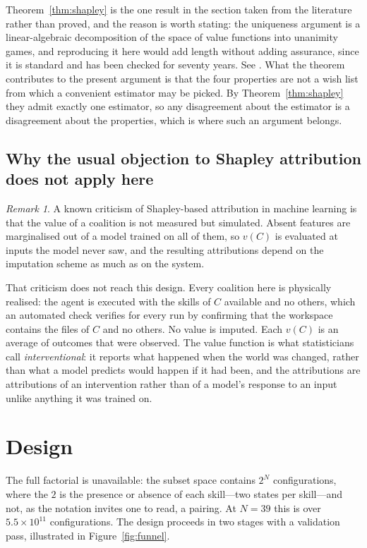 \documentclass[11pt]{article}
\theoremstyle{plain}
\theoremstyle{definition}
\theoremstyle{remark}
\newtheorem{remark}[theorem]{Remark}
\begin{document}
Theorem~\ref{thm:shapley} is the one result in the section taken from the literature rather than proved, and the reason is worth stating: the uniqueness argument is a linear-algebraic decomposition of the space of value functions into unanimity games, and reproducing it here would add length without adding assurance, since it is standard and has been checked for seventy years. See \cite{shapley}. What the theorem contributes to the present argument is that the four properties are not a wish list from which a convenient estimator may be picked. By Theorem~\ref{thm:shapley} they admit exactly one estimator, so any disagreement about the estimator is a disagreement about the properties, which is where such an argument belongs.

\subsection{Why the usual objection to Shapley attribution does not apply here}

\begin{remark}\label{rem:interventional}
A known criticism of Shapley-based attribution in machine learning \cite{kumar} is that the value of a coalition is not measured but simulated. Absent features are marginalised out of a model trained on all of them, so $v(C)$ is evaluated at inputs the model never saw, and the resulting attributions depend on the imputation scheme as much as on the system.

That criticism does not reach this design. Every coalition here is physically realised: the agent is executed with the skills of $C$ available and no others, which an automated check verifies for every run by confirming that the workspace contains the files of $C$ and no others. No value is imputed. Each $v(C)$ is an average of outcomes that were observed. The value function is what statisticians call \emph{interventional}: it reports what happened when the world was changed, rather than what a model predicts would happen if it had been, and the attributions are attributions of an intervention rather than of a model's response to an input unlike anything it was trained on.
\end{remark}

\section{Design}
\label{sec:design}

The full factorial is unavailable: the subset space contains $2^N$ configurations, where the $2$ is the presence or absence of each skill---two states per skill---and not, as the notation invites one to read, a pairing. At $N = 39$ this is over $5.5 \times 10^{11}$ configurations. The design proceeds in two stages with a validation pass, illustrated in Figure~\ref{fig:funnel}.
\end{document}
